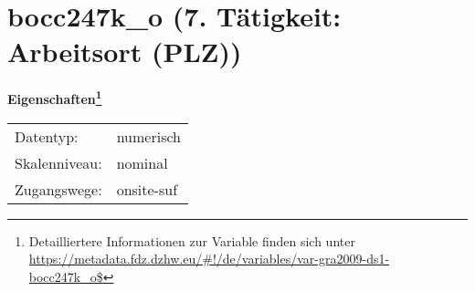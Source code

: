 
    \setcounter{footnote}{0}

    \vspace*{-1.8cm}
	\section{bocc247k\_o (7. Tätigkeit: Arbeitsort (PLZ))}
	\label{section:bocc247k_o}



    \vspace*{0.5cm}
    \noindent\textbf{Eigenschaften\footnote{Detailliertere Informationen zur Variable finden sich unter
		\url{https://metadata.fdz.dzhw.eu/\#!/de/variables/var-gra2009-ds1-bocc247k_o$}}}\\
	\begin{tabularx}{\hsize}{@{}lX}
	Datentyp: & numerisch \\
	Skalenniveau: & nominal \\
	Zugangswege: &
	  onsite-suf
 \\
    \end{tabularx}



